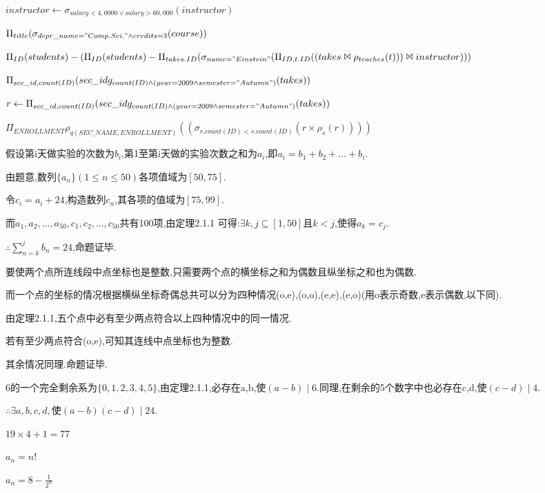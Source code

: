 \documentclass[a4paper]{ctexart}
\begin{document}
	\par
	$instructor\gets{}\sigma_{salary<4,0000\lor{}salary>60,000}(instructor)$%
	\par
	$\Pi_{title}(\sigma_{depr\_name="Comp.Sci."\land{}credits=3}(course))$%
	\par
	$\Pi_{ID}(students)-(\Pi_{ID}(students)-\Pi_{takes.ID}(\sigma_{name="Einstein"}(\Pi_{ID,t.ID}((takes\Join{}\rho_{teaches}(t)))\Join{}instructor)))$%
	\par
	$\Pi_{sec\_id,count(ID)}(sec\_idg_{count(ID)\land{}(year=2009\land{}semester="Autumn")}(takes))$%
	\par
	$r\gets{}\Pi_{sec\_id,count(ID)}(sec\_idg_{count(ID)\land{}(year=2009\land{}semester="Autumn")}(takes))$
	\par
	$\Pi_{ENROLLMENT}\rho_{q(SEC\_NAME,ENROLLMENT)}((\sigma_{r.count(ID)<s.count(ID)}(r\times{}\rho_{s}(r))))$\par
	假设第i天做实验的次数为$b_{i}$,第1至第i天做的实验次数之和为$a_{i}$,即$a_{i}=b_{1}+b_{2}+\dots{}+b_{i}$.\par
	由题意,$数列\{a_{n}\}(1\leq{}n\leq{}50)$各项值域为$[50,75]$.\par
	令$c_{i}=a_{i}+24$,构造数列${c_{n}}$,其各项的值域为$[75,99]$.\par
	而$a_{1},a_{2},\dots,{}a_{50},c_{1},c_{2},\dots{},c_{50}$共有100项,由定理2.1.1
	可得:$\exists{}k,j\subseteq{}[1,50]$且$k<j$,使得$a_{k}=c_{j}$.\par
	$\therefore{}\sum_{n=k}^j{}b_n=24$,命题证毕.\par
	要使两个点所连线段中点坐标也是整数,只需要两个点的横坐标之和为偶数且纵坐标之和也为偶数.\par
	而一个点的坐标的情况根据横纵坐标奇偶总共可以分为四种情况(o,e),(o,o),(e,e),(e,o)(用o表示奇数,e表示偶数,以下同).\par
	由定理2.1.1,五个点中必有至少两点符合以上四种情况中的同一情况.\par
	若有至少两点符合(o,e),可知其连线中点坐标也为整数.\par
	其余情况同理.命题证毕.\par
	6的一个完全剩余系为$\{0,1,2,3,4,5\}$,由定理2.1.1,必存在a,b,使$(a-b)\mid{}6$.同理,在剩余的5个数字中也必存在c,d,使$(c-d)\mid{}4$.\par
	$\therefore{}\exists{}a,b,c,d,使(a-b)(c-d)\mid{}24$.\par
	$19\times{}4+1=77$\par
	$a_{n}=n!$\par
	$a_{n}=8-\frac{1}{2^n}$\par
\end{document}
